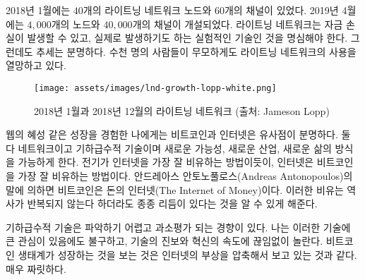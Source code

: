 \begin{comment}
	In January 2018, the lightning network had $40$ nodes and $60$
	channels~\cite{web:lightning-nodes}. In April 2019, the network grew to more
	than $4000$ nodes and around $40.000$ channels. Keep in mind that this is still
	experimental technology where loss of funds can and does occur. Yet the trend is
	clear: thousands of people are reckless and eager to use it.
\end{comment}
2018년 1월에는 $40$개의 라이트닝 네트워크 노드와 $60$개의 채널이 있었다\cite{web:lightning-nodes}.
2019년 4월에는 $4,000$개의 노드와  $40,000$개의 채널이 개설되었다.
라이트닝 네트워크는 자금 손실이 발생할 수 있고, 실제로 발생하기도 하는 실험적인 기술인 것을 명심해야 한다.
그런데도 추세는 분명하다. 
수천 명의 사람들이 무모하게도 라이트닝 네트워크의 사용을 열망하고 있다.

\begin{figure}
	\texttt{[image: assets/images/lnd-growth-lopp-white.png]}
	\caption{2018년 1월과 2018년 12월의 라이트닝 네트워크 (출처: Jameson Lopp)}
	\label{fig:lnd-growth-lopp-white.png}
\end{figure}

\begin{comment}
	To me, having lived through the meteoric rise of the web, the parallels
	between the internet and Bitcoin are obvious. Both are networks, both
	are exponential technologies, and both enable new possibilities, new
	industries, new ways of life. Just like electricity was the best
	metaphor to understand where the internet is heading, the internet might
	be the best metaphor to understand where bitcoin is heading. Or, in the
	words of Andreas Antonopoulos, Bitcoin is \textit{The Internet of Money}.
	These metaphors are a great reminder that while history doesn't repeat
	itself, it often rhymes.
\end{comment}
웹의 혜성 같은 성장을 경험한 나에게는 비트코인과 인터넷은 유사점이 분명하다.
둘 다 네트워크이고 기하급수적 기술이며 새로운 가능성, 새로운 산업, 새로운 삶의 방식을 가능하게 한다.
전기가 인터넷을 가장 잘 비유하는 방법이듯이, 인터넷은 비트코인을 가장 잘 비유하는 방법이다.
안드레아스 안토노풀로스(Andreas Antonopoulos)의 말에 의하면 비트코인은 돈의 인터넷(The Internet of Money)이다.
이러한 비유는 역사가 반복되지 않는다 하더라도 종종 리듬이 있다는 것을 알 수 있게 해준다.

\begin{comment}
	Exponential technologies are hard to grasp and often underestimated.
	Even though I have a great interest in such technologies, I am
	constantly surprised by the pace of progress and innovation. Watching
	the Bitcoin ecosystem grow is like watching the rise of the internet in
	fast-forward. It is exhilarating.
\end{comment}
기하급수적 기술은 파악하기 어렵고 과소평가 되는 경향이 있다.
나는 이러한 기술에 큰 관심이 있음에도 불구하고, 기술의 진보와 혁신의 속도에 끊임없이 놀란다.
비트코인 생태계가 성장하는 것을 보는 것은 인터넷의 부상을 압축해서 보고 있는 것과 같다.
매우 짜릿하다.

